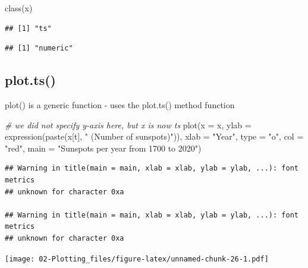 \documentclass[
]{book}
\newenvironment{Shaded}{\begin{snugshade}}{\end{snugshade}}
\newcommand{\AttributeTok}[1]{\textcolor[rgb]{0.77,0.63,0.00}{#1}}
\newcommand{\CommentTok}[1]{\textcolor[rgb]{0.56,0.35,0.01}{\textit{#1}}}
\newcommand{\FunctionTok}[1]{\textcolor[rgb]{0.00,0.00,0.00}{#1}}
\newcommand{\NormalTok}[1]{#1}
\newcommand{\OtherTok}[1]{\textcolor[rgb]{0.56,0.35,0.01}{#1}}
\newcommand{\SpecialCharTok}[1]{\textcolor[rgb]{0.00,0.00,0.00}{#1}}
\newcommand{\StringTok}[1]{\textcolor[rgb]{0.31,0.60,0.02}{#1}}
\theoremstyle{definition}
\theoremstyle{definition}
\theoremstyle{definition}
\theoremstyle{definition}
\theoremstyle{remark}
\begin{document}
\begin{Shaded}
\begin{Highlighting}[]
\FunctionTok{class}\NormalTok{(x)}
\end{Highlighting}
\end{Shaded}

\begin{verbatim}
## [1] "ts"
\end{verbatim}

\begin{Shaded}
\end{Shaded}

\begin{verbatim}
## [1] "numeric"
\end{verbatim}

\hypertarget{plot.ts}{%
\subsection{plot.ts()}\label{plot.ts}}

plot() is a generic function - uses the plot.ts() method function

\begin{Shaded}
\begin{Highlighting}[]
\CommentTok{\# we did not specify y{-}axis here, but x is now ts}
\FunctionTok{plot}\NormalTok{(}\AttributeTok{x =}\NormalTok{ x, }\AttributeTok{ylab =} \FunctionTok{expression}\NormalTok{(}\FunctionTok{paste}\NormalTok{(x[t], }\StringTok{" (Number of }
\StringTok{   sunspots)"}\NormalTok{)), }\AttributeTok{xlab =} \StringTok{"Year"}\NormalTok{, }\AttributeTok{type =} \StringTok{"o"}\NormalTok{, }\AttributeTok{col =} \StringTok{"red"}\NormalTok{, main }
   \OtherTok{=} \StringTok{"Sunspots per year from 1700 to 2020"}\NormalTok{)}
\end{Highlighting}
\end{Shaded}

\begin{verbatim}
## Warning in title(main = main, xlab = xlab, ylab = ylab, ...): font metrics
## unknown for character 0xa

## Warning in title(main = main, xlab = xlab, ylab = ylab, ...): font metrics
## unknown for character 0xa
\end{verbatim}

\texttt{[image: 02-Plotting\_files/figure-latex/unnamed-chunk-26-1.pdf]}
\end{document}
